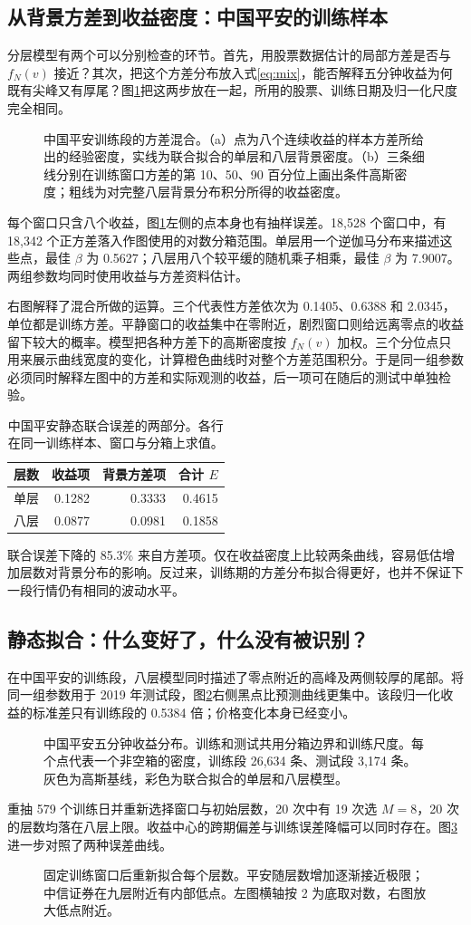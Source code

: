 \documentclass[11pt,a4paper]{article}
\newcommand{\chart}[4]{\begin{figure}[H]\centering\resizebox{#1\linewidth}{!}{}\caption{#3}\label{#4}\end{figure}}
\begin{document}
\clearpage
\subsection{从背景方差到收益密度：中国平安的训练样本}
分层模型有两个可以分别检查的环节。首先，用股票数据估计的局部方差是否与 $f_N(v)$ 接近？其次，把这个方差分布放入式\eqref{eq:mix}，能否解释五分钟收益为何既有尖峰又有厚尾？图\ref{fig:mixture}把这两步放在一起，所用的股票、训练日期及归一化尺度完全相同。
\chart{.98}{variance_mixture}{中国平安训练段的方差混合。（a）点为八个连续收益的样本方差所给出的经验密度，实线为联合拟合的单层和八层背景密度。（b）三条细线分别在训练窗口方差的第 10、50、90 百分位上画出条件高斯密度；粗线为对完整八层背景分布积分所得的收益密度。}{fig:mixture}
每个窗口只含八个收益，图\ref{fig:mixture}左侧的点本身也有抽样误差。18,528 个窗口中，有 18,342 个正方差落入作图使用的对数分箱范围。单层用一个逆伽马分布来描述这些点，最佳 $\beta$ 为 0.5627；八层用八个较平缓的随机乘子相乘，最佳 $\beta$ 为 7.9007。两组参数均同时使用收益与方差资料估计。

右图解释了混合所做的运算。三个代表性方差依次为 0.1405、0.6388 和 2.0345，单位都是训练方差。平静窗口的收益集中在零附近，剧烈窗口则给远离零点的收益留下较大的概率。模型把各种方差下的高斯密度按 $f_N(v)$ 加权。三个分位点只用来展示曲线宽度的变化，计算橙色曲线时对整个方差范围积分。于是同一组参数必须同时解释左图中的方差和实际观测的收益，后一项可在随后的测试中单独检验。

\begin{table}[H]\centering\small
\caption{中国平安静态联合误差的两部分。各行在同一训练样本、窗口与分箱上求值。}\begin{tabular}{lrrr}\toprule
层数 & 收益项 & 背景方差项 & 合计 $E$\\\midrule
单层 & 0.1282 & 0.3333 & 0.4615\\
八层 & 0.0877 & 0.0981 & 0.1858\\\bottomrule
\end{tabular}\end{table}
联合误差下降的 85.3\% 来自方差项。仅在收益密度上比较两条曲线，容易低估增加层数对背景分布的影响。反过来，训练期的方差分布拟合得更好，也并不保证下一段行情仍有相同的波动水平。


\clearpage
\subsection{静态拟合：什么变好了，什么没有被识别？}
在中国平安的训练段，八层模型同时描述了零点附近的高峰及两侧较厚的尾部。将同一组参数用于 2019 年测试段，图\ref{fig:static}右侧黑点比预测曲线更集中。该段归一化收益的标准差只有训练段的 0.5384 倍；价格变化本身已经变小。
\chart{.97}{density_plot}{中国平安五分钟收益分布。训练和测试共用分箱边界和训练尺度。每个点代表一个非空箱的密度，训练段 26,634 条、测试段 3,174 条。灰色为高斯基线，彩色为联合拟合的单层和八层模型。}{fig:static}
重抽 579 个训练日并重新选择窗口与初始层数，20 次中有 19 次选 $M=8$，20 次的层数均落在八层上限。收益中心的跨期偏差与训练误差降幅可以同时存在。图\ref{fig:depth}进一步对照了两种误差曲线。
\chart{.97}{depth_extension}{固定训练窗口后重新拟合每个层数。平安随层数增加逐渐接近极限；中信证券在九层附近有内部低点。左图横轴按 2 为底取对数，右图放大低点附近。}{fig:depth}
\end{document}
